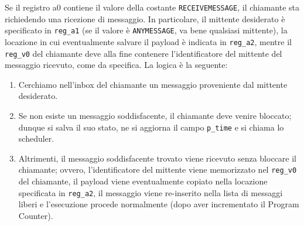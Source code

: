 \documentclass[a4paper]{article}
\begin{document}
Se il registro a0 contiene il valore della costante \verb+RECEIVEMESSAGE+, il chiamante sta richiedendo una ricezione di messaggio. In particolare, il mittente  desiderato è specificato in \verb+reg_a1+ (se il valore è \verb+ANYMESSAGE+, va bene qualsiasi mittente), la locazione in cui eventualmente salvare il payload è indicata in \verb+reg_a2+, mentre il \verb+reg_v0+ del chiamante deve alla fine contenere l'identificatore del mittente del messaggio ricevuto, come da specifica. La logica è la seguente:
\begin{enumerate}
\item Cerchiamo nell'inbox del chiamante un messaggio proveniente dal mittente desiderato.
\item Se non esiste un messaggio soddisfacente, il chiamante deve venire bloccato; dunque si salva il suo stato, ne si aggiorna il campo \verb+p_time+ e si chiama lo scheduler.
\item Altrimenti, il messaggio soddisfacente trovato viene ricevuto senza bloccare il chiamante; ovvero, l'identificatore del mittente viene memorizzato nel \verb+reg_v0+ del chiamante, il payload viene eventualmente copiato nella locazione specificata in \verb+reg_a2+, il messaggio viene re-inserito nella lista di messaggi liberi e l'esecuzione procede normalmente (dopo aver incrementato il Program Counter).
\end{enumerate}
\end{document}
